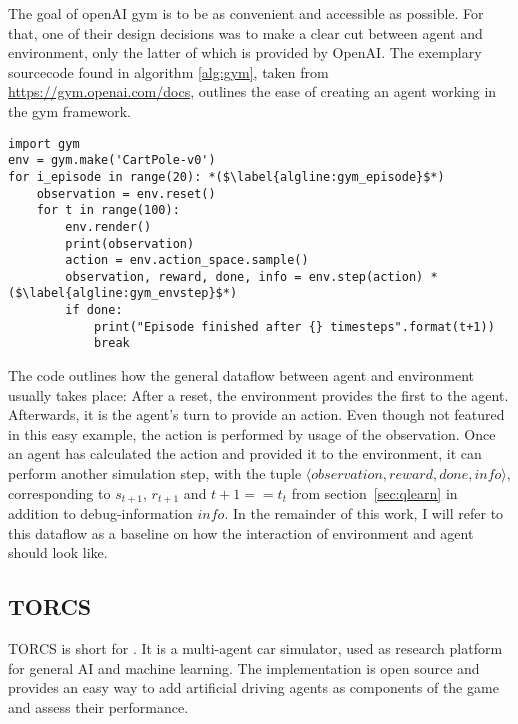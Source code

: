 The goal of openAI gym is to be as convenient and accessible as possible. For that, one of their design decisions was to make a clear cut between agent and environment, only the latter of which is provided by OpenAI. The exemplary sourcecode found in algorithm \ref{alg:gym}, taken from \url{https://gym.openai.com/docs}, outlines the ease of creating an agent working in the gym framework.
\begin{algorithm}[h]
\begin{lstlisting}[style=Python]
import gym
env = gym.make('CartPole-v0')
for i_episode in range(20): *($\label{algline:gym_episode}$*)
	observation = env.reset()
	for t in range(100):
		env.render()
		print(observation)
		action = env.action_space.sample()
		observation, reward, done, info = env.step(action) *($\label{algline:gym_envstep}$*)
		if done:
			print("Episode finished after {} timesteps".format(t+1))
			break
\end{lstlisting}%
\caption{Interaction with the openAI gym environment}
\label{alg:gym}
\end{algorithm}


The code outlines how the general dataflow between agent and environment usually takes place: After a reset, the environment provides the first  to the agent. Afterwards, it is the agent's turn to provide an action. Even though not featured in this easy example, the action is performed by usage of the observation. Once an agent has calculated the action and provided it to the environment, it can perform another simulation step, with the tuple $\langle observation, reward, done, info\rangle$, corresponding to $s_{t+1}$, $r_{t+1}$ and $t+1==t_t$ from section~\ref{sec:qlearn} in addition to debug-information $info$. In the remainder of this work, I will refer to this dataflow as a baseline on how the interaction of environment and agent should look like.

\subsection{TORCS}

TORCS is short for \cite{wymann_torcs_2013, wymann_torcs_2015}. It is a multi-agent car simulator, used as research platform for general AI and machine learning. The implementation is open source and provides an easy way to add artificial driving agents as components of the game and assess their performance. 

